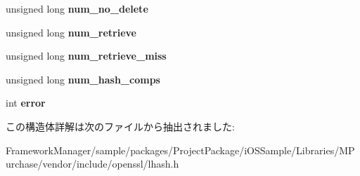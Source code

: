 \begin{DoxyCompactItemize}
\item 
\hypertarget{structlhash__st_a54547ec18c8eb65436be64ed20981d30}{}unsigned long {\bfseries num\+\_\+no\+\_\+delete}\label{structlhash__st_a54547ec18c8eb65436be64ed20981d30}

\item 
\hypertarget{structlhash__st_a82b26dec352a27b9b886c305765c665f}{}unsigned long {\bfseries num\+\_\+retrieve}\label{structlhash__st_a82b26dec352a27b9b886c305765c665f}

\item 
\hypertarget{structlhash__st_a387e6db76e41d95cdcdb97a518eda2a8}{}unsigned long {\bfseries num\+\_\+retrieve\+\_\+miss}\label{structlhash__st_a387e6db76e41d95cdcdb97a518eda2a8}

\item 
\hypertarget{structlhash__st_a9e918c731a184cab5fa9a7919b3633c4}{}unsigned long {\bfseries num\+\_\+hash\+\_\+comps}\label{structlhash__st_a9e918c731a184cab5fa9a7919b3633c4}

\item 
\hypertarget{structlhash__st_aec4f09d46d46d5734bc1d66706533ed3}{}int {\bfseries error}\label{structlhash__st_aec4f09d46d46d5734bc1d66706533ed3}

\end{DoxyCompactItemize}


この構造体詳解は次のファイルから抽出されました\+:\begin{DoxyCompactItemize}
\item 
Framework\+Manager/sample/packages/\+Project\+Package/i\+O\+S\+Sample/\+Libraries/\+M\+Purchase/vendor/include/openssl/lhash.\+h\end{DoxyCompactItemize}
